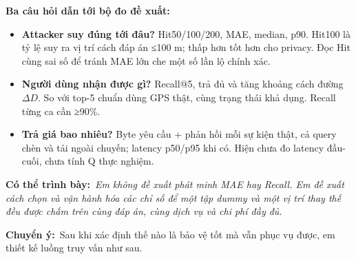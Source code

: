 \documentclass[10pt,a4paper]{article}
\newcommand{\say}[1]{\par\textbf{Có thể trình bày:}\ \textit{#1}\par}
\newcommand{\transition}[1]{\par\textbf{Chuyển ý:}\ #1\par}
\begin{document}
\textbf{Ba câu hỏi dẫn tới bộ đo đề xuất:}
\begin{itemize}
\item \textbf{Attacker suy đúng tới đâu?} Hit50/100/200, MAE, median, p90. Hit100 là tỷ lệ suy ra vị trí cách đáp án ≤100 m; thấp hơn tốt hơn cho privacy. Đọc Hit cùng sai số để tránh MAE lớn che một số lần lộ chính xác.
\item \textbf{Người dùng nhận được gì?} Recall@5, trả đủ và tăng khoảng cách đường $\Delta D$. So với top-5 chuẩn dùng GPS thật, cùng trạng thái khả dụng. Recall từng ca cần ≥90\%.
\item \textbf{Trả giá bao nhiêu?} Byte yêu cầu + phản hồi mỗi sự kiện thật, cả query chèn và tải ngoài chuyến; latency p50/p95 khi có. Hiện chưa đo latency đầu-cuối, chưa tính Q thực nghiệm.
\end{itemize}
\say{Em không đề xuất phát minh MAE hay Recall. Em đề xuất cách chọn và vận hành hóa các chỉ số để một tập dummy và một vị trí thay thế đều được chấm trên cùng đáp án, cùng dịch vụ và chi phí đầy đủ.}
\transition{Sau khi xác định thế nào là bảo vệ tốt mà vẫn phục vụ được, em thiết kế luồng truy vấn như sau.}
\end{document}
